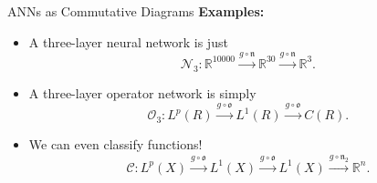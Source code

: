 \begin{columns}[t,totalwidth=\twocolwid]
\begin{column}{\onecolwid}
\begin{block}{ANNs as Commutative Diagrams}
	\textbf{Examples:}
	\begin{itemize}
		\item A three-layer neural network is just
		\begin{equation*}
			\mathcal{N}_3: \mathbb{R}^{10000} \xrightarrow{g \circ \mathfrak{n}}\mathbb{R}^{30}  \xrightarrow{g \circ \mathfrak{n}} \mathbb{R}^{3}.
		\end{equation*}
		\item A three-layer operator network is simply
		\begin{equation*}
			\mathcal{O}_3: L^p(R) 	 \xrightarrow{g \circ \mathfrak{o}} L^1(R) \xrightarrow{g \circ \mathfrak{o}} C(R).
		\end{equation*}
		\item We can even classify functions!
		\begin{equation*}
			\mathcal{C}:  L^p(X) 	 \xrightarrow{g \circ \mathfrak{o}} L^1(X)  \xrightarrow{g \circ \mathfrak{o}} L^1(X)\xrightarrow{g \circ \mathfrak{n}_2}  \mathbb{R}^n.
		\end{equation*}
	\end{itemize}
\end{block}

\end{column}

\end{columns}
